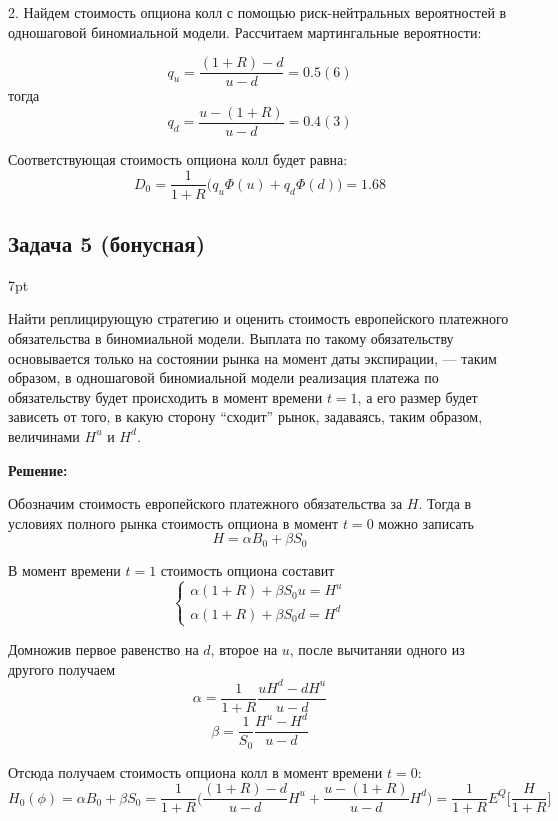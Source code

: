 \documentclass[a4paper,12pt]{article}
\newenvironment{formal}{%
	\def\FrameCommand{%
		\hspace{1pt}%
		{\color{black}\vrule width 1.5pt}%
		{\color{white}\vrule width 4pt}%
		\colorbox{white}%
	}%
	\MakeFramed{\advance\hsize-\width\FrameRestore}%
	\noindent\hspace{-4.55pt}%
	\begin{adjustwidth}{}{7pt}%
		\vspace{2pt}\vspace{2pt}%
	}
	{%
		\vspace{2pt}\end{adjustwidth}\endMakeFramed%
}
\begin{document}
2. Найдем стоимость опциона колл с помощью риск-нейтральных вероятностей в одношаговой биномиальной модели. Рассчитаем мартингальные вероятности:

\begin{equation*}
	q_u = \frac{(1+R) - d}{u-d} = 0.5(6)
\end{equation*}
тогда
\begin{equation*}
	q_d = \frac{u - (1+R)}{u-d} = 0.4(3)
\end{equation*}

Соответствующая стоимость опциона колл будет равна:
\begin{equation*}
	D_0 = \frac{1}{1+R} \Big( q_u \Phi(u) + q_d \Phi(d) \Big) = 1.68
\end{equation*}

\subsection*{Задача 5 (бонусная)}
\begin{formal}
Найти реплицирующую стратегию и оценить стоимость европейского платежного обязательства в биномиальной модели. Выплата по такому обязательству основывается только на состоянии рынка на момент даты экспирации, — таким образом, в одношаговой биномиальной модели реализация платежа по обязательству будет происходить в момент времени $t = 1$, а его размер будет зависеть от того, в какую сторону ``сходит'' рынок, задаваясь, таким образом, величинами $H^u$ и $H^d$.
\end{formal}
\textbf{\large Решение:}

Обозначим стоимость европейского платежного обязательства за $H$. Тогда в условиях полного рынка стоимость опциона в момент $t=0$ можно записать
\begin{equation*}
	H = \alpha B_0 + \beta S_0
\end{equation*}

В момент времени $t=1$ стоимость опциона составит
\begin{equation*}
	\begin{cases}
		\alpha(1+R) + \beta S_0 u = H^u\\
		\alpha(1+R) + \beta S_0 d = H^d
	\end{cases}
\end{equation*}

Домножив первое равенство на $d$, второе на $u$, после вычитаняи одного из другого получаем
\begin{equation*}
	\alpha = \frac{1}{1+R} \frac{u H^d-d H^u}{u-d}
\end{equation*}
\begin{equation*}
	\beta = \frac{1}{S_0} \frac{H^u-H^d}{u-d}
\end{equation*}

Отсюда получаем стоимость опциона колл в момент времени $t=0$:
\begin{equation*}
	H_0(\phi) = \alpha B_0 + \beta S_0 = \frac{1}{1+R} \bigg( \frac{(1+R) - d}{u-d} H^u + \frac{u - (1+R)}{u-d} H^d \bigg) = \frac{1}{1+R} E^Q \bigg[\frac{H}{1+R}\bigg]
\end{equation*}
\end{document}
